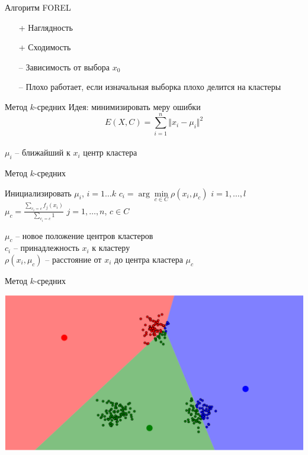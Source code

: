 \documentclass[10pt]{beamer}
\begin{document}
\begin{frame}{Алгоритм FOREL}
	\begin{itemize} [<+- | alert@+>]
		\item[+] Наглядность
		\item[+] Сходимость
		\bigbreak
		\item[--] Зависимость от выбора $x_0$
		\item[--] Плохо работает, если изначальная выборка плохо делится на кластеры
	\end{itemize}
\end{frame}


\begin{frame}{Метод $k$-средних}
	\alert{Идея}: минимизировать меру ошибки\\
	\bigbreak
	$${E(X, C) = \sum\limits_{i = 1}^n \Vert x_i -\mu_i \Vert^2}$$\\
	\bigbreak
	$\mu_i$ -- ближайший к $x_i$ центр кластера
\end{frame}

\begin{frame}{Метод $k$-средних}
	\begin{algorithmic}[1]
            \State Инициализировать $\mu_i$, $i = 1 \dots k$
                \State $c_i = \arg\min\limits_{c \in C} \rho(x_i, \mu_c)$ \hspace{5mm} $i = 1,\dots, l$
                \State ${\mu_c = \frac{\sum\limits_{c_i = c} f_j(x_i)}{\sum\limits_{c_i = c} 1} }$ \hspace{10mm} $j = 1,\dots, n$, $c \in C$
             \EndRepeat
        \EndFunction
    \end{algorithmic}    
	\bigbreak
	\bigbreak
	$\mu_c$ -- новое положение центров кластеров\\
	$c_i$ -- принадлежность $x_i$ к кластеру\\
	$\rho(x_i, \mu_c)$ -- расстояние от $x_i$ до центра кластера $\mu_c$
\end{frame}

\begin{frame}{Метод $k$-средних}
	\begin{center}
	  \includegraphics[width= \textwidth, keepaspectratio = true]{images/kmeans1}   
	\end{center}
\end{frame}
\end{document}
